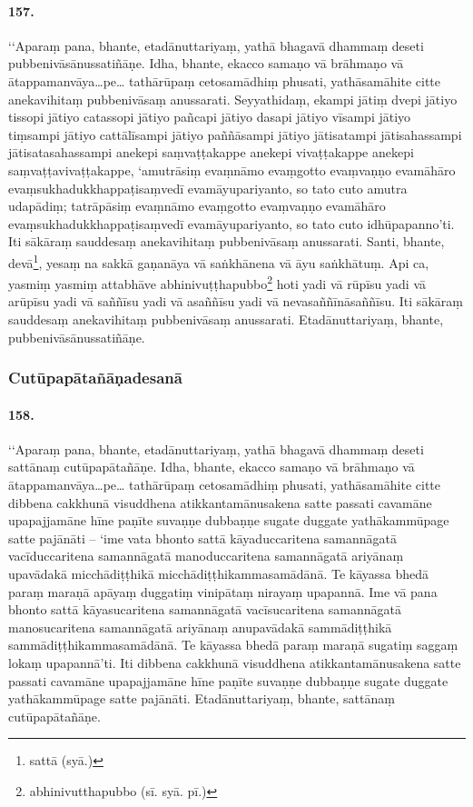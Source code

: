 \paragraph{157.} ‘‘Aparaṃ pana, bhante, etadānuttariyaṃ, yathā bhagavā dhammaṃ deseti pubbenivāsānussatiñāṇe. Idha, bhante, ekacco samaṇo vā brāhmaṇo vā ātappamanvāya…pe… tathārūpaṃ cetosamādhiṃ phusati, yathāsamāhite citte anekavihitaṃ pubbenivāsaṃ anussarati. Seyyathidaṃ, ekampi jātiṃ dvepi jātiyo tissopi jātiyo catassopi jātiyo pañcapi jātiyo dasapi jātiyo vīsampi jātiyo tiṃsampi jātiyo cattālīsampi jātiyo paññāsampi jātiyo jātisatampi jātisahassampi jātisatasahassampi anekepi saṃvaṭṭakappe anekepi vivaṭṭakappe anekepi saṃvaṭṭavivaṭṭakappe, ‘amutrāsiṃ evaṃnāmo evaṃgotto evaṃvaṇṇo evamāhāro evaṃsukhadukkhappaṭisaṃvedī evamāyupariyanto, so tato cuto amutra udapādiṃ; tatrāpāsiṃ evaṃnāmo evaṃgotto evaṃvaṇṇo evamāhāro evaṃsukhadukkhappaṭisaṃvedī evamāyupariyanto, so tato cuto idhūpapanno’ti. Iti sākāraṃ sauddesaṃ anekavihitaṃ pubbenivāsaṃ anussarati. Santi, bhante, devā\footnote{sattā (syā.)}, yesaṃ na sakkā gaṇanāya vā saṅkhānena vā āyu saṅkhātuṃ. Api ca, yasmiṃ yasmiṃ attabhāve abhinivuṭṭhapubbo\footnote{abhinivutthapubbo (sī. syā. pī.)} hoti yadi vā rūpīsu yadi vā arūpīsu yadi vā saññīsu yadi vā asaññīsu yadi vā nevasaññīnāsaññīsu. Iti sākāraṃ sauddesaṃ anekavihitaṃ pubbenivāsaṃ anussarati. Etadānuttariyaṃ, bhante, pubbenivāsānussatiñāṇe.

\subsubsection{Cutūpapātañāṇadesanā}

\paragraph{158.} ‘‘Aparaṃ pana, bhante, etadānuttariyaṃ, yathā bhagavā dhammaṃ deseti sattānaṃ cutūpapātañāṇe. Idha, bhante, ekacco samaṇo vā brāhmaṇo vā ātappamanvāya…pe… tathārūpaṃ cetosamādhiṃ phusati, yathāsamāhite citte dibbena cakkhunā visuddhena atikkantamānusakena satte passati cavamāne upapajjamāne hīne paṇīte suvaṇṇe dubbaṇṇe sugate duggate yathākammūpage satte pajānāti – ‘ime vata bhonto sattā kāyaduccaritena samannāgatā vacīduccaritena samannāgatā manoduccaritena samannāgatā ariyānaṃ upavādakā micchādiṭṭhikā micchādiṭṭhikammasamādānā. Te kāyassa bhedā paraṃ maraṇā apāyaṃ duggatiṃ vinipātaṃ nirayaṃ upapannā. Ime vā pana bhonto sattā kāyasucaritena samannāgatā vacīsucaritena samannāgatā manosucaritena samannāgatā ariyānaṃ anupavādakā sammādiṭṭhikā sammādiṭṭhikammasamādānā. Te kāyassa bhedā paraṃ maraṇā sugatiṃ saggaṃ lokaṃ upapannā’ti. Iti dibbena cakkhunā visuddhena atikkantamānusakena satte passati cavamāne upapajjamāne hīne paṇīte suvaṇṇe dubbaṇṇe sugate duggate yathākammūpage satte pajānāti. Etadānuttariyaṃ, bhante, sattānaṃ cutūpapātañāṇe.


